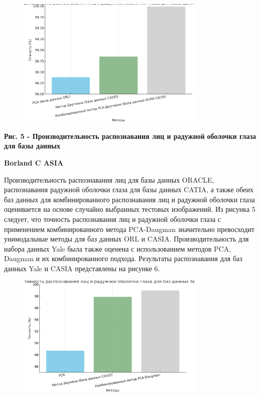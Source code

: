 \begin{figure}[H]
	\centering
	\includegraphics[width=0.8\textwidth]{assets/87}
	\caption*{}
\end{figure}

{\bfseries Рис. 5 - Производительность распознавания лиц и радужной}
{\bfseries оболочки глаза для базы данных}

{\bfseries Borland C ASIA}

Производительность распознавания лиц для базы данных ORACLE,
распознавания радужной оболочки глаза для базы данных CATIA, а также
обеих баз данных для комбинированного распознавания лиц и радужной
оболочки глаза оценивается на основе случайно выбранных тестовых
изображений. Из рисунка 5 следует, что точность распознавания лиц и
радужной оболочки глаза с применением комбинированного метода
PCA-Daugman значительно превосходит унимодальные методы для баз данных
ORL и CASIA. Производительность для набора данных Yale была также
оценена с использованием методов PCA, Daugman и их комбинированного
подхода. Результаты распознавания для баз данных Yale и CASIA
представлены на рисунке 6.

\begin{figure}[H]
	\centering
	\includegraphics[width=0.8\textwidth]{assets/88}
	\caption*{}
\end{figure}

